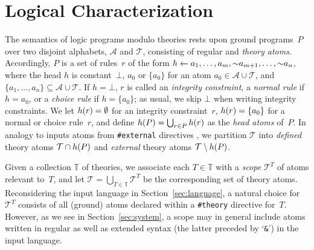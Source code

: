 
\section{Logical Characterization}
\label{sec:foundations}

The semantics of logic programs modulo theories rests upon
ground programs~$P$ over two disjoint alphabets, $\mathcal{A}$ and $\mathcal{T}$,
consisting of regular and \emph{theory atoms}. %
Accordingly, $P$ is a set of rules~$r$ of the form
$h \leftarrow a_1,\dots,a_m,{\sim}{a_{m+1}},\dots,{\sim}{a_n}$,
where the head $h$ is constant~$\bot$, $a_0$ or $\{a_0\}$
for an atom $a_0\in\mathcal{A}\cup\mathcal{T}$, and
$\{a_1,\dots,a_n\}\subseteq\mathcal{A}\cup\mathcal{T}$.
If $h=\bot$, $r$ is called an \emph{integrity constraint},
a \emph{normal rule} if $h=a_0$, or
a \emph{choice rule} if $h=\{a_0\}$;
as usual, we skip $\bot$ when writing integrity constraints.
We let $h(r)=\emptyset$ for an integrity constraint~$r$,
$h(r)=\{a_0\}$ for a normal or choice rule~$r$,
and define $h(P)=\bigcup_{r\in P}h(r)$ as the \emph{head atoms} of~$P$.
In analogy to inputs atoms from
\lstinline{#external} directives \cite{gekakasc14b},
we partition $\mathcal{T}$ into
\emph{defined} theory atoms $\mathcal{T}\cap h(P)$ and
\emph{external} theory atoms $\mathcal{T}\setminus h(P)$.

Given a collection $\mathbb{T}$ of theories,
we associate each $T\in\mathbb{T}$ with a \emph{scope}
$\mathcal{T}^T$ of atoms
relevant to~$T$, and let
$\mathcal{T}=\bigcup_{T\in\mathbb{T}}\mathcal{T}^T$
be the corresponding set of theory atoms.
Reconsidering the input language in Section~\ref{sec:language},
a natural choice for $\mathcal{T}^T$ consists %
of all (ground) atoms declared within a
\lstinline{#theory} directive for~$T$.
However, as we see in Section~\ref{sec:system},
a scope
may in general include atoms written in
regular as well as extended syntax (the latter preceded by `\lstinline{&}') in the input language.

